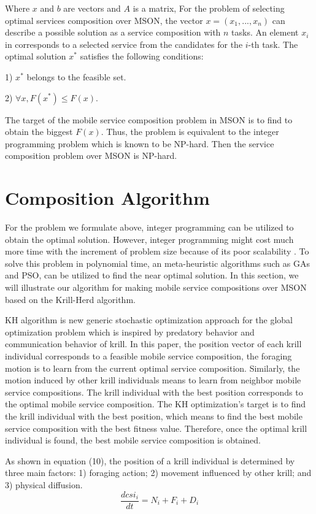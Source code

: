 \documentclass[10pt,journal,compsoc]{IEEEtran}
\begin{document}
Where $x$ and $b$ are vectors and $A$ is a matrix, For the problem of selecting optimal services composition over MSON, the vector $x = (x_1, . . . , x_n)$ can describe a possible solution as a service composition with $n$ tasks. An element $x_i$ in corresponds to a selected service from the candidates for the $i$-th task. The optimal solution  $x^*$ satisfies the following conditions:

1) $x^*$ belongs to the feasible set.

​2) $\forall x, F(x^*) \le F(x)$. 

The target of the mobile service composition problem in MSON is to find to obtain the biggest $F(x)$. Thus, the problem is equivalent to the integer programming problem which is known to be NP-hard. Then the service composition problem over MSON is NP-hard.

\section{Composition Algorithm}
For the problem we formulate above, integer programming can be utilized to obtain the optimal solution. However, integer programming might cost much more time with the increment of problem size because of its poor scalability \cite{nemhauser1988integer}. To solve this problem in polynomial time, an meta-heuristic algorithms such as GAs and PSO, can be utilized to find the near optimal solution.
In this section, we will illustrate our algorithm for making mobile service compositions over MSON based on the Krill-Herd algorithm.

​KH algorithm \cite{gandomi2012krill} is new generic stochastic optimization approach for the global optimization problem which is inspired by predatory behavior and communication behavior of krill. 
In this paper, the position vector of each krill individual corresponds to a feasible mobile service composition, 
the foraging motion is to learn from the current optimal service composition. 
Similarly, the motion induced by other krill individuals means to learn from neighbor mobile service compositions.
The krill individual with the best position corresponds to the optimal mobile service composition. 
The KH optimization's target is to find the krill individual with the best position, which means to find the best mobile service composition with the best fitness value. 
Therefore, once the optimal krill individual is found, the best mobile service composition is obtained.

As shown in equation (10), the position of a krill individual is determined by three main factors: 1) foraging action; 2) movement influenced by other krill; and 3) physical diffusion. 
\begin{equation}
\frac{dcsi_i}{dt} =N_i+F_i+D_i
\end{equation}
\end{document}

